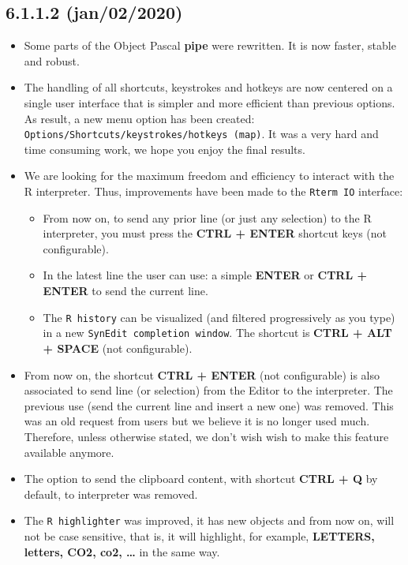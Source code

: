 \subsection*{6.1.1.2 (jan/02/2020)}
\begin{itemize}
  \item Some parts of the Object Pascal \textbf{pipe} were rewritten. It is now faster, stable and robust.
  \item The handling of all shortcuts, keystrokes and hotkeys are now centered on a single user interface
    that is simpler and more efficient than previous options. As result, a new menu option has been
    created: \texttt{Options/Shortcuts/keystrokes/hotkeys (map)}. It was a very hard and time consuming work,
    we hope you enjoy the final results.
  \item We are looking for the maximum freedom and efficiency to interact with the R interpreter.
    Thus, improvements have been made to the \texttt{Rterm IO} interface:
    \begin{itemize}
      \item From now on, to send any prior line (or just any selection) to the R interpreter, you must press the
        \textbf{CTRL + ENTER} shortcut keys (not configurable).
      \item In the latest line the user can use: a simple \textbf{ENTER} or \textbf{CTRL + ENTER} to send the current line.
      \item The \texttt{R history} can be visualized (and filtered progressively as you type) in a new \texttt{SynEdit completion window}.
        The shortcut is \textbf{CTRL + ALT + SPACE} (not configurable).
    \end{itemize}
  \item From now on, the shortcut \textbf{CTRL + ENTER} (not configurable) is also associated to send line (or selection) from the
    Editor to the \RR{} interpreter. The previous use (send the current line and insert a new one) was removed. This was an old request
    from users but we believe it is no longer used much. Therefore, unless otherwise stated, we don't wish wish to make this feature available anymore.
  \item The option to send the clipboard content, with shortcut \textbf{CTRL + Q} by default, to \RR{} interpreter was removed.
  \item The \texttt{R highlighter} was improved, it has new objects and from now on, will not be case sensitive, that is, it will highlight, for example,
    \textbf{LETTERS, letters, CO2, co2, \ldots} in the same way.

\end{itemize}
